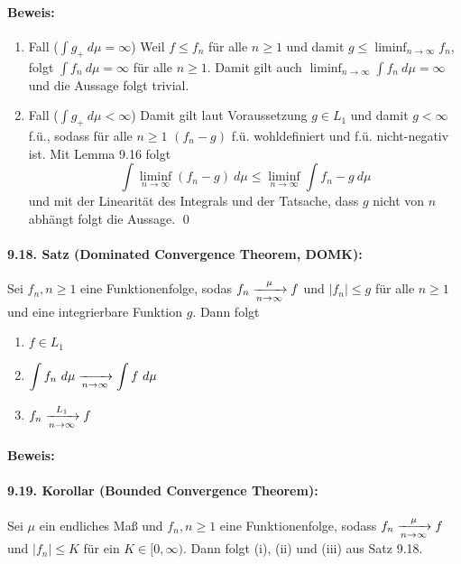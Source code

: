 \documentclass[11pt]{report}
\begin{document}
\paragraph{Beweis:}
\begin{enumerate}[label=\Roman*.]
    \item Fall ($\int g_+\ d\mu=\infty$)\newline
    Weil $f\leq f_n$ f\"ur alle $n\geq1$ und damit $g\leq\liminf_{n\to\infty}f_n$, folgt $\int f_n\ d\mu=\infty$ f\"ur alle $n\geq1$. Damit gilt auch $\liminf_{n\to\infty}\int f_n\ d\mu=\infty$ und die Aussage folgt trivial.
    \item Fall ($\int g_+\ d\mu<\infty$)\newline
    Damit gilt laut Voraussetzung $g\in L_1$ und damit $g<\infty$ f.\"u., sodass f\"ur alle $n\geq1$ $(f_n-g)$ f.\"u. wohldefiniert und  f.\"u. nicht-negativ ist. Mit Lemma 9.16 folgt
    $$\int\liminf_{n\to\infty}(f_n-g)\ d\mu\leq\liminf_{n\to\infty}\int f_n-g\ d\mu$$
    und mit der Linearit\"at des Integrals und der Tatsache, dass $g$ nicht von $n$ abh\"angt folgt die Aussage. \qed
\end{enumerate}

\paragraph{9.18. Satz (Dominated Convergence Theorem, DOMK):} Sei $f_n,n\geq1$ eine Funktionenfolge, sodas $f_n\nto{\mu}{n\to\infty}f$ und $|f_n|\leq g$ f\"ur alle $n\geq1$ und eine integrierbare Funktion $g$. Dann folgt
\begin{enumerate}[label=(\roman*)]
    \item $f\in L_1$
    \item $\displaystyle\int f_n\ d\mu\nto{}{n\to\infty}\int f\ d\mu$
    \item $f_n\nto{L_1}{n\to\infty}f$
\end{enumerate}

\paragraph{Beweis:}

\paragraph{9.19. Korollar (Bounded Convergence Theorem):}Sei $\mu$ ein endliches Ma\ss{} und $f_n,n\geq1$ eine Funktionenfolge, sodass $f_n\nto{\mu}{n\to\infty}f$ und $|f_n|\leq K$ f\"ur ein $K\in[0,\infty)$. Dann folgt (i), (ii) und (iii) aus Satz 9.18.
\end{document}
